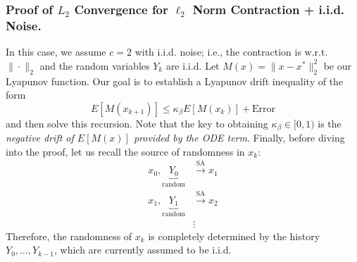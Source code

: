 \documentclass[11pt,twoside]{article}
\begin{document}
\subsubsection{Proof of $L_2$ Convergence for $\ell_2$ Norm Contraction + i.i.d. Noise.} 
In this case, we assume $c=2$ with i.i.d. noise; i.e., the contraction is w.r.t. $\|\cdot\|_2$ and the random variables $Y_k$ are i.i.d. Let $M(x) = \|x-x^*\|_2^2$ be our Lyapunov function. Our goal is to establish a Lyapunov drift inequality of the form 
\[
E[M(x_{k+1})] \leq \kappa_{\beta}E[M(x_{k})] + \text{Error}
\]
and then solve this recursion. Note that the key to obtaining $\kappa_{\beta} \in [0,1)$ is the \emph{negative drift of $E[M(x)]$ provided by the ODE term}. Finally, before diving into the proof, let us recall the source of randomness in $x_k$:
\begin{align*}
    x_0,\underbrace{Y_0}_{\text{random}} &\overset{\text{SA}}{\longrightarrow} x_1 \\
    x_1,\underbrace{Y_1}_{\text{random}} &\overset{\text{SA}}{\longrightarrow} x_2 \\
    &\vdots
\end{align*}
Therefore, the randomness of $x_k$ is completely determined by the history $Y_0, \dots, Y_{k-1}$, which are currently assumed to be i.i.d.
\end{document}
